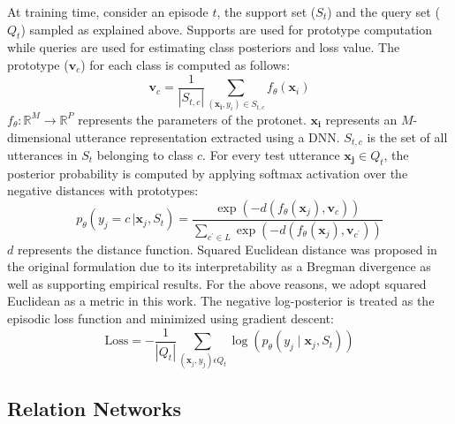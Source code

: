 At training time, consider an episode $t$, the support set ($S_t$) and the query set ($Q_t$) sampled as explained above. Supports are used for prototype computation while queries are used for estimating class posteriors and loss value. 
The prototype ($\mathbf{v}_c$) for each class is computed as follows:
\begin{equation}
\label{eqn:proto_basic}
    \mathbf{v}_{c} = \frac{1}{|S_{t,c}|} \sum_{(\mathbf{x_{i}},y_{i})\in S_{t,c}} f_{\theta}(\mathbf{x}_i)
\end{equation}
$f_{\theta} : \mathbb{R}^M \rightarrow \mathbb{R}^P$ represents the parameters of the protonet. $\mathbf{x_i}$ represents an $M$-dimensional utterance representation extracted using a DNN.
$S_{t,c}$ is the set of all utterances in $S_t$ belonging to class $c$. For every test utterance $\mathbf{x_j} \in Q_t$, the posterior probability is computed by applying softmax activation over the negative distances with prototypes:
\begin{equation}
\label{sofmax-eq2}
    p_\theta(y_j=c\,| \mathbf{x}_j, S_t)=\frac{\exp \left(-d\left(f_{\theta}(\mathbf{x}_j), \mathbf{v}_c\right)\right)}{\sum_{c^{\prime} \in L} \exp \left(-d\left(f_{\theta}(\mathbf{x}_j), \mathbf{v}_{c^{\prime}}\right)\right)}
\end{equation}
$d$ represents the distance function. 
Squared Euclidean distance was proposed in the original formulation \cite{snell2017prototypical} due to its interpretability as 
a Bregman divergence \cite{banerjee2005} as well as supporting empirical results. For the above reasons, we adopt squared Euclidean as a metric in this work.
The negative log-posterior is treated as the episodic loss function and minimized using gradient descent:
\begin{equation}
\label{eqn:proto_backprop}
 \text{Loss} = - \frac{1}{|Q_t|} \sum_{(\mathbf{x}_j,y_{j})\epsilon Q_t } \log(p_\theta(y_j \mid \mathbf{x}_j, S_t)) 
\end{equation}

\subsection{Relation Networks}

